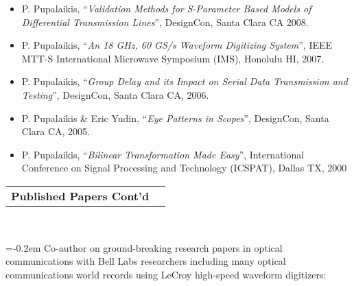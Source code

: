 \documentclass[10pt,letterpaper]{extarticle}
\makeatletter
\newenvironment{indentsection}[1]%
{\begin{list}{}%
	{\setlength{\leftmargin}{#1}}%
	\item[]%
}
{\end{list}}
\newcommand{\headerrow}[2]
{\begin{tabular*}{\linewidth}{l@{\extracolsep{\fill}}r}
	#1 &
	#2 \\
\end{tabular*}}
\makeatother
\begin{document}
\begin{indentsection}{-1em}
\begin{itemize}
\item P. Pupalaikis, “\emph{Validation Methods for S-Parameter Based Models of Differential Transmission Lines}”, DesignCon, Santa Clara CA 2008. 
\item P. Pupalaikis, “\emph{An 18 GHz, 60 GS/s Waveform Digitizing System}”, IEEE MTT-S International Microwave Symposium (IMS), Honolulu HI, 2007. 
\item P. Pupalaikis, “\emph{Group Delay and its Impact on Serial Data Transmission and Testing}”, DesignCon, Santa Clara CA, 2006. 
\item P. Pupalaikis \& Eric Yudin, “\emph{Eye Patterns in Scopes}”, DesignCon, Santa Clara CA, 2005. 
\item P. Pupalaikis, “\emph{Bilinear Transformation Made Easy}”, International Conference on Signal Processing and Technology (ICSPAT), Dallas TX, 2000 
\end{itemize}\end{indentsection}
\clearpage
\headerrow
	{\large \textbf{Published Papers Cont'd}}
	{}\\
\begin{flushleft} 
\parskip=-0.2em
Co-author on ground-breaking research papers in optical communications with Bell Labs researchers including many optical communications world records using LeCroy high-speed waveform digitizers:
\end{flushleft}
\end{document}
